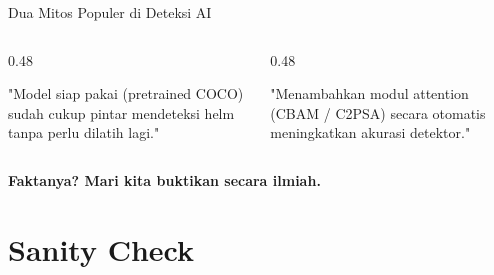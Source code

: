 \documentclass[aspectratio=169,10pt]{beamer}
\begin{document}
\begin{frame}{Dua Mitos Populer di Deteksi AI}
    \begin{columns}[t]
        \begin{column}{0.48\textwidth}
            \centering
            \colorbox{primary!10}{}
            \vspace{0.8em}
            
            \small
            "Model siap pakai (pretrained COCO) sudah cukup pintar mendeteksi helm tanpa perlu dilatih lagi."
        \end{column}
        
        \begin{column}{0.48\textwidth}
            \centering
            \colorbox{primary!10}{}
            \vspace{0.8em}
            
            \small
            "Menambahkan modul attention (CBAM / C2PSA) secara otomatis meningkatkan akurasi detektor."
        \end{column}
    \end{columns}
    
    \vspace{2.5em}
    \centering
    \large\textbf{\color{secondary}Faktanya? Mari kita buktikan secara ilmiah.}
\end{frame}

\section{Sanity Check}
\end{document}
